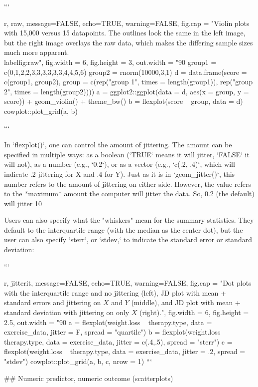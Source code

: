 {```{r, raw, message=FALSE, echo=TRUE, warning=FALSE, fig.cap = "Violin plots with 15,000 versus 15 datapoints. The outlines look the same in the left image, but the right image overlays the raw data, which makes the differing sample sizes much more apparent. \\label{fig:raw}", fig.width = 6, fig.height = 3, out.width = "90%
group1 = c(0,1,2,2,3,3,3,3,3,3,4,4,5,6)
group2 = rnorm(10000,3,1)
d = data.frame(score = c(group1, group2), 
               group = c(rep("group 1", times = length(group1)), 
                       rep("group 2", times = length(group2))))
a = ggplot2::ggplot(data = d, aes(x = group, y = score)) +  
  geom_violin() + theme_bw()
b = flexplot(score ~ group, data = d)
cowplot::plot_grid(a, b)

```


In `flexplot()`, one can control the amount of jittering. The amount can be specified in multiple ways: as a boolean (`TRUE` means it will jitter, `FALSE` it will not), as a number (e.g., `0.2`), or as a vector (e.g., `c(.2, .4)`, which will indicate .2 jittering for X and .4 for Y). Just as it is in `geom_jitter()`, this number refers to the amount of jittering on either side. However, the value refers to the *maximum* amount the computer will jitter the data. So, 0.2 (the default) will jitter 10%

Users can also specify what the "whiskers" mean for the summary statistics. They default to the interquartile range (with the median as the center dot), but the user can also specify `sterr`, or `stdev,` to indicate the standard error or standard deviation:


```{r, jitterit, message=FALSE, echo=TRUE, warning=FALSE, fig.cap = "Dot plots with the interquartile range and no jittering (left), JD plot with mean + standard errors and jittering on $X$ and $Y$ (middle), and JD plot with mean + standard deviation with jittering on only $X$ (right).", fig.width = 6, fig.height = 2.5, out.width = "90%
a = flexplot(weight.loss ~ therapy.type, data = exercise_data, 
             jitter = F, spread = "quartile")
b = flexplot(weight.loss ~ therapy.type, data = exercise_data, 
             jitter = c(.4,.5), spread = "sterr")
c = flexplot(weight.loss ~ therapy.type, data = exercise_data, 
             jitter = .2, spread = "stdev")
cowplot::plot_grid(a, b, c, nrow = 1)
```


## Numeric predictor, numeric outcome (scatterplots)

}}}
